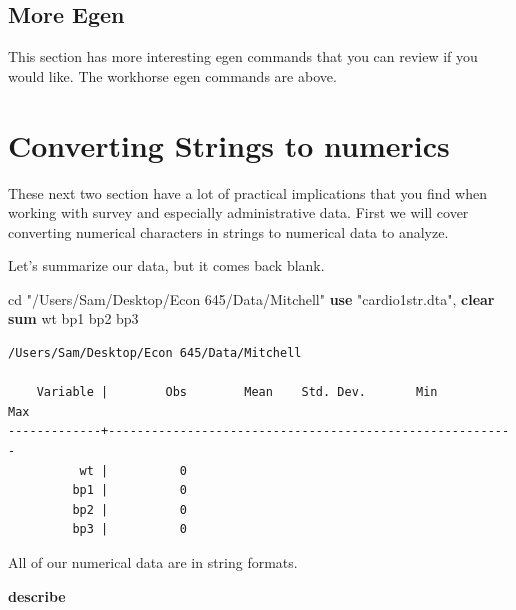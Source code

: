 \documentclass[
]{book}
\newenvironment{Shaded}{\begin{snugshade}}{\end{snugshade}}
\newcommand{\KeywordTok}[1]{\textcolor[rgb]{0.13,0.29,0.53}{\textbf{#1}}}
\newcommand{\NormalTok}[1]{#1}
\newcommand{\StringTok}[1]{\textcolor[rgb]{0.31,0.60,0.02}{#1}}
\begin{document}
\subsection{More Egen}\label{more-egen}

This section has more interesting egen commands that you can review if you would like. The workhorse egen commands are above.

\section{Converting Strings to numerics}\label{converting-strings-to-numerics}

These next two section have a lot of practical implications that you find when working with survey and especially administrative data. First we will cover converting numerical characters in strings to numerical data to analyze.

Let's summarize our data, but it comes back blank.

\begin{Shaded}
\begin{Highlighting}[]
\NormalTok{cd }\StringTok{"/Users/Sam/Desktop/Econ 645/Data/Mitchell"}
\KeywordTok{use} \StringTok{"cardio1str.dta"}\NormalTok{, }\KeywordTok{clear}
\KeywordTok{sum}\NormalTok{ wt bp1 bp2 bp3}
\end{Highlighting}
\end{Shaded}

\begin{verbatim}
/Users/Sam/Desktop/Econ 645/Data/Mitchell

    Variable |        Obs        Mean    Std. Dev.       Min        Max
-------------+---------------------------------------------------------
          wt |          0
         bp1 |          0
         bp2 |          0
         bp3 |          0
\end{verbatim}

All of our numerical data are in string formats.

\begin{Shaded}
\begin{Highlighting}[]
\KeywordTok{describe}
\end{Highlighting}
\end{Shaded}
\end{document}
